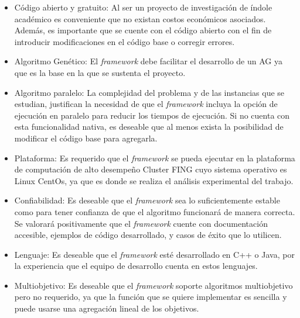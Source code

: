 \begin{itemize}
	\item Código abierto y gratuito: Al ser un proyecto de investigación de índole académico es conveniente que no existan costos económicos asociados. Además, es importante que se cuente con el código abierto con el fin de introducir modificaciones en el código base o corregir errores.
	\item Algoritmo Genético: El \emph{framework} debe facilitar el desarrollo de un AG ya que es la base en la que se sustenta el proyecto.
	\item Algoritmo paralelo: La complejidad del problema y de las instancias que se estudian, justifican la necesidad de que el \emph{framework} incluya la opción de ejecución en paralelo para reducir los tiempos de ejecución. Si no cuenta con esta funcionalidad nativa, es deseable que al menos exista la posibilidad de modificar el código base para agregarla.
	\item Plataforma: Es requerido que el \emph{framework} se pueda ejecutar en la plataforma de computación de alto desempeño Cluster FING cuyo sistema operativo es Linux CentOs, ya que es donde se realiza el análisis experimental del trabajo. 
	\newline
	\newline
	\item Confiabilidad: Es deseable que el \emph{framework} sea lo suficientemente estable como para tener confianza de que el algoritmo funcionará de manera correcta. Se valorará positivamente que el \emph{framework} cuente con documentación accesible, ejemplos de código desarrollado, y casos de éxito que lo utilicen.
	\item Lenguaje: Es deseable que el \emph{framework} esté desarrollado en C++ o Java, por la experiencia que el equipo de desarrollo cuenta en estos lenguajes. 
	\item Multiobjetivo: Es deseable que el \emph{framework} soporte algoritmos multiobjetivo pero no requerido, ya que la función que se quiere implementar es sencilla y puede usarse una agregación lineal de los objetivos.
\end{itemize} 

